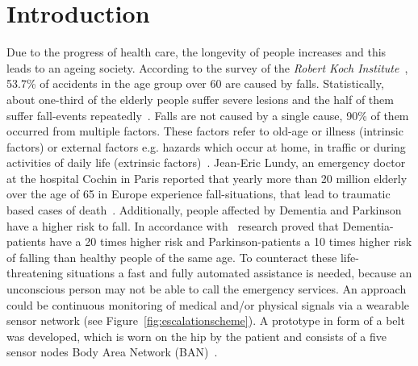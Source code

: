 \documentclass[journal]{IEEEtran}
\begin{document}




%
\IEEEpeerreviewmaketitle



\section{Introduction}
Due to the progress of health care, the longevity of people increases and this leads to an ageing society.
According to the survey of the \textit{Robert Koch Institute}~\cite{Varnaccia2013}, 53.7\% of accidents in the age 
group over 60 are caused by falls. Statistically, about one-third of the elderly people suffer severe lesions and the half of them suffer 
fall-events repeatedly~\cite{Schott2008}. Falls are not caused by a single cause, 90\% of them occurred from multiple factors. These 
factors refer to old-age or illness (intrinsic factors) or external factors e.g. hazards which occur at home, in traffic or during activities 
of daily life (extrinsic factors)~\cite{Schott2008}. Jean-Eric Lundy, an emergency doctor at the hospital Cochin in Paris reported that yearly more than 20 million 
elderly over the age of 65 in Europe experience fall-situations, that lead to traumatic based cases of death~\cite{APAOTS2013}. 
Additionally, people affected by Dementia and Parkinson have a higher risk to fall. In accordance with~\cite{Monks} research proved that 
Dementia-patients have a 20 times higher risk and Parkinson-patients a 10 times higher risk of falling than healthy people of the same age. 
To counteract these life-threatening situations a fast and fully automated assistance is needed, because an unconscious person may not be 
able to call the emergency services. An approach could be continuous monitoring of medical and/or physical signals via a wearable sensor 
network (see Figure~\ref{fig:escalationscheme}). A prototype in form of a belt was developed, which is worn on the hip by the patient and consists 
of a five sensor nodes Body Area Network (BAN)~\cite{LaBlunda.2016,LaBlunda.2016b}. 
\end{document}
